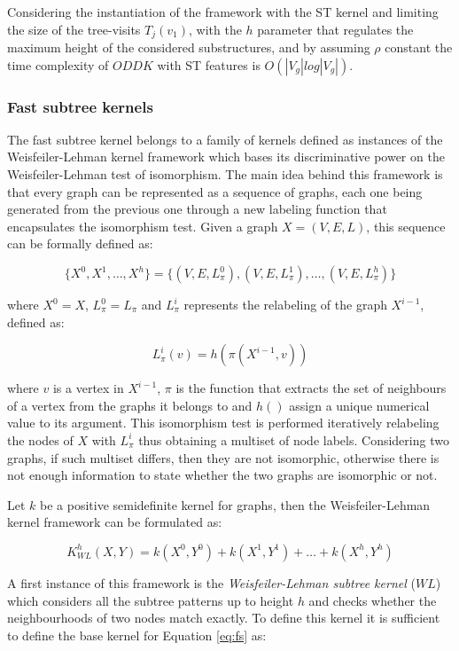 Considering the instantiation of the framework with the ST kernel and limiting
the size of the tree-visits $T_j(v_1)$, with the $h$ parameter that regulates the
maximum height of the considered substructures, and by assuming $\rho$ constant
the time complexity of $ODDK$ with ST features is $O(|V_g|log|V_g|)$.

\subsubsection{Fast subtree kernels}
\label{subsubsec:fs}
The fast subtree kernel \cite{NIPS2009_3813} belongs to a family of kernels defined
as instances of the Weisfeiler-Lehman kernel framework which bases its discriminative
power on the Weisfeiler-Lehman test of isomorphism.
The main idea behind this framework is that every graph can be represented as
a sequence of graphs, each one being generated from the previous one through
a new labeling function that encapsulates the isomorphism test.
Given a graph $X = (V,E,L)$, this sequence can be formally defined as:

\[\{X^0,X^1,\dots,X^h\} = \{(V,E,L^0_\pi),(V,E,L^1_\pi),\dots,(V,E,L^h_\pi)\}\]

where $X^0 = X$, $L^0_\pi = L_\pi$ and $L^i_\pi$ represents the relabeling of the graph
$X^{i-1}$, defined as:

\[L^i_\pi(v) = h(\pi(X^{i-1},v))\]

where $v$ is a vertex in $X^{i-1}$, $\pi$ is the function that extracts the set
of neighbours of a vertex from the graphs it belongs to and $h()$ assign a unique
numerical value to its argument.
This isomorphism test is performed iteratively relabeling the nodes of $X$ with
$L^i_\pi$ thus obtaining a multiset of node labels. 
Considering two graphs, if such multiset differs, then they are not isomorphic,
otherwise there is not enough information to state whether the two graphs are
isomorphic or not.

Let $k$ be a positive semidefinite kernel for graphs, then the Weisfeiler-Lehman kernel
framework can be formulated as:

\begin{equation}
    K_{WL}^h(X,Y) = k(X^0,Y^0) + k(X^1,Y^1) + \dots + k(X^h,Y^h)
    \label{eq:fs}
\end{equation}

A first instance of this framework is the \emph{Weisfeiler-Lehman subtree kernel}
($WL$) which considers all the subtree patterns up to height $h$ and checks whether the
neighbourhoods of two nodes match exactly.
To define this kernel it is sufficient to define the base kernel for Equation
\ref{eq:fs} as:

